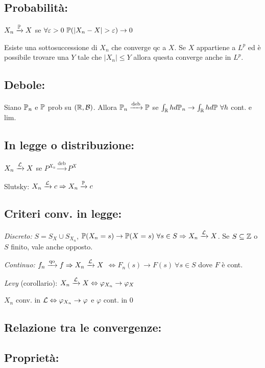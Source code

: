 \subsection{Probabilità:}

$X_n\xrightarrow{\mathbb P} X$ se $\forall \varepsilon >0\ \mathbb P(| X_n -X| >\varepsilon )\rightarrow 0$

Esiste una sottosuccessione di $X_n$ che converge qc a $X$. Se $X$ appartiene a $L^p$ ed è possibile trovare una $Y$ tale che $| X_n| \leq Y$ allora questa converge anche in $L^p$.
\subsection{Debole:}

Siano $\mathbb P_n$ e $\mathbb P$ prob su $(\mathbb R ,\mathcal B )$. Allora $\mathbb P_n\xrightarrow{\text{deb}}\mathbb P$ se $\int_{\RR} hd\PP_n\rightarrow \int_{\RR} hd\PP \ \forall h$ cont. e lim.
\subsection{In legge o distribuzione:}

$X_n\xrightarrow{\mathcal L} X$ se $P^{X_n}\xrightarrow{\text{deb}} P^X$

Slutsky: $X_n\xrightarrow{\mathcal L} c\Rightarrow X_n\xrightarrow{\mathbb P} c$
\subsection{Criteri conv. in legge:}

\textit{Discreto:} $S=S_X \cup S_{X_n}$, $\mathbb P( X_n =s)\rightarrow \mathbb P (X=s)\ \forall s\in S\Rightarrow X_n\xrightarrow{\mathcal L} X$. Se $S\subseteq \mathbb Z$ o $S$ finito, vale anche opposto.

\textit{Continuo:} $f_n\xrightarrow{\text{qo}} f\Rightarrow X_n\xrightarrow{\mathcal L} X$ $\Leftrightarrow F_n (s)\rightarrow F(s)\ \forall s\in S$ dove $F$ è cont.

\textit{Levy} (corollario): $X_n\xrightarrow{\mathcal L} X\Leftrightarrow \varphi_{X_n}\rightarrow \varphi_X$

$X_n$ conv. in $\mathcal L \Leftrightarrow \varphi_{X_n}\rightarrow \varphi $ e $\varphi $ cont. in $0$
\subsection{Relazione tra le convergenze:}



\subsection{Proprietà:}

